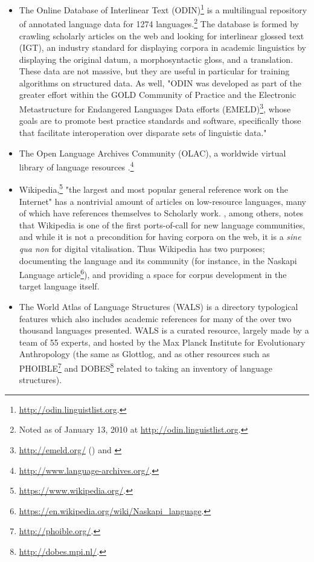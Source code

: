 \begin{itemize}
\item The Online Database of Interlinear Text (ODIN)\footnote{\href{http://odin.linguistlist.org}{http://odin.linguistlist.org}. } is a multilingual repository of annotated language data for 1274 languages.\footnote{Noted as of January 13, 2010 at \href{http://odin.linguistlist.org}{http://odin.linguistlist.org}. } The database is formed by crawling scholarly articles on the web and looking for interlinear glossed text (IGT), an industry standard for displaying corpora in academic linguistics by displaying the original datum, a morphosyntactic gloss, and a translation. These data are not massive, but they are useful in particular for training algorithms on structured data. As well, "ODIN was developed as part of the greater effort within the GOLD Community of Practice \citep{farrar2007gold} and the Electronic Metastructure for Endangered Languages Data efforts (EMELD)\footnote{\href{http://emeld.org/}{http://emeld.org/} () and \citet{farrar2002common}}, whose goals are to promote best practice standards and software, specifically those that facilitate interoperation over disparate sets of linguistic data." \citep{lewis2010developing}

\item The Open Language Archives Community (OLAC), a worldwide virtual library of language resources \citep{simons2003open}.\footnote{\href{http://www.language-archives.org/}{http://www.language-archives.org/}. }

\item Wikipedia,\footnote{\href{https://www.wikipedia.org/}{https://www.wikipedia.org/}. } "the largest and most popular general reference work on the Internet" \citep{wiki:Wikipedia} has a nontrivial amount of articles on low-resource languages, many of which have references themselves to Scholarly work. \citet{kornai2013digital}, among others, notes that Wikipedia is one of the first ports-of-call for new language communities, and while it is not a precondition for having corpora on the web, it is a {\it sine qua non} for digital vitalisation. Thus Wikipedia has two purposes; documenting the language and its community (for instance, in the Naskapi Language article\footnote{\href{https://en.wikipedia.org/wiki/Naskapi\_language}{https://en.wikipedia.org/wiki/Naskapi\_language}. }), and providing a space for corpus development in the target language itself.

\item The World Atlas of Language Structures (WALS) is a directory typological features which also includes academic references for many of the over two thousand languages presented. WALS is a curated resource, largely made by a team of 55 experts, and hosted by the Max Planck Institute for Evolutionary Anthropology (the same as Glottlog, and as other resources such as PHOIBLE\footnote{\href{http://phoible.org/}{http://phoible.org/}. } \citep{phoible} and DOBES\footnote{\href{http://dobes.mpi.nl/}{http://dobes.mpi.nl/}. } \citep{wittenburg2003dobes} related to taking an inventory of language structures). \citep{wals}


\end{itemize}
